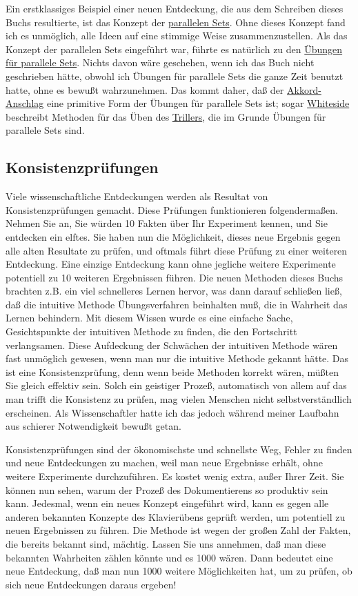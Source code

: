 Ein erstklassiges Beispiel einer neuen Entdeckung, die aus dem Schreiben dieses Buchs resultierte, ist das Konzept der \hyperlink{c1ii11}{parallelen Sets}.
 Ohne dieses Konzept fand ich es unmöglich, alle Ideen auf eine stimmige Weise zusammenzustellen.
 Als das Konzept der parallelen Sets eingeführt war, führte es natürlich zu den \hyperlink{c1iii7b}{Übungen für parallele Sets}.
 Nichts davon wäre geschehen, wenn ich das Buch nicht geschrieben hätte, obwohl ich Übungen für parallele Sets die ganze Zeit benutzt hatte, ohne es bewußt wahrzunehmen.
 Das kommt daher, daß der \hyperlink{c1ii9}{Akkord-Anschlag} eine primitive Form der Übungen für parallele Sets ist; sogar \hyperlink{Whiteside}{Whiteside} beschreibt Methoden für das Üben des \hyperlink{c1iii3}{Trillers}, die im Grunde Übungen für parallele Sets sind.
 \hypertarget{c3_3e}{}

\subsection{Konsistenzprüfungen}

Viele wissenschaftliche Entdeckungen werden als Resultat von Konsistenzprüfungen gemacht.
 Diese Prüfungen funktionieren folgendermaßen.
 Nehmen Sie an, Sie würden 10 Fakten über Ihr Experiment kennen, und Sie entdecken ein elftes.
 Sie haben nun die Möglichkeit, dieses neue Ergebnis gegen alle alten Resultate zu prüfen, und oftmals führt diese Prüfung zu einer weiteren Entdeckung.
 Eine einzige Entdeckung kann ohne jegliche weitere Experimente potentiell zu 10 weiteren Ergebnissen führen.
 Die neuen Methoden dieses Buchs brachten z.B. ein viel schnelleres Lernen hervor, was dann darauf schließen ließ, daß die intuitive Methode Übungsverfahren beinhalten muß, die in Wahrheit das Lernen behindern.
 Mit diesem Wissen wurde es eine einfache Sache, Gesichtspunkte der intuitiven Methode zu finden, die den Fortschritt verlangsamen.
 Diese Aufdeckung der Schwächen der intuitiven Methode wären fast unmöglich gewesen, wenn man nur die intuitive Methode gekannt hätte.
 Das ist eine Konsistenzprüfung, denn wenn beide Methoden korrekt wären, müßten Sie gleich effektiv sein.
 Solch ein geistiger Prozeß, automatisch von allem auf das man trifft die Konsistenz zu prüfen, mag vielen Menschen nicht selbstverständlich erscheinen.
 Als Wissenschaftler hatte ich das jedoch während meiner Laufbahn aus schierer Notwendigkeit bewußt getan.
 

Konsistenzprüfungen sind der ökonomischste und schnellste Weg, Fehler zu finden und neue Entdeckungen zu machen, weil man neue Ergebnisse erhält, ohne weitere Experimente durchzuführen.
 Es kostet wenig extra, außer Ihrer Zeit.
 Sie können nun sehen, warum der Prozeß des Dokumentierens so produktiv sein kann.
 Jedesmal, wenn ein neues Konzept eingeführt wird, kann es gegen alle anderen bekannten Konzepte des Klavierübens geprüft werden, um potentiell zu neuen Ergebnissen zu führen.
 Die Methode ist wegen der großen Zahl der Fakten, die bereits bekannt sind, mächtig.
 Lassen Sie uns annehmen, daß man diese bekannten Wahrheiten zählen könnte und es 1000 wären.
 Dann bedeutet eine neue Entdeckung, daß man nun 1000 weitere Möglichkeiten hat, um zu prüfen, ob sich neue Entdeckungen daraus ergeben!
 

